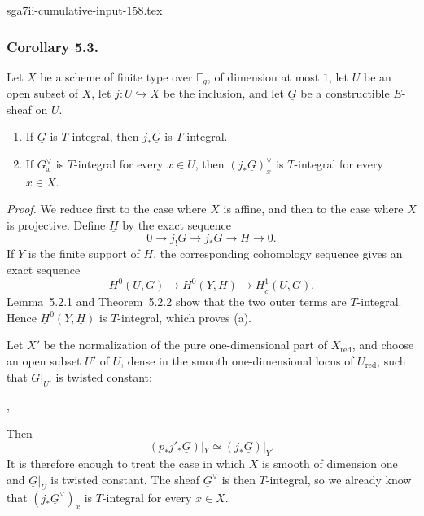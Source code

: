 \begin{filecontents*}{sga7ii-cumulative-input-158.tex}
\subsubsection*{Corollary 5.3.}
Let $X$ be a scheme of finite type over $\mathbb F_q$, of dimension at most
$1$, let $U$ be an open subset of $X$, let $j:U\hookrightarrow X$ be the
inclusion, and let $\underline G$ be a constructible $E$-sheaf on $U$.

\begin{enumerate}[label=(\alph*)]
\item If $\underline G$ is $T$-integral, then $j_*\underline G$ is
  $T$-integral.
\item If $G_x^\vee$ is $T$-integral for every $x\in U$, then
  $(j_*\underline G)_x^\vee$ is $T$-integral for every $x\in X$.
\end{enumerate}

\medskip
\noindent\emph{Proof.}
We reduce first to the case where $X$ is affine, and then to the case where
$X$ is projective.  Define $\underline H$ by the exact sequence
\[
0\longrightarrow j_!\underline G\longrightarrow j_*\underline G
\longrightarrow\underline H\longrightarrow0.
\]
If $Y$ is the finite support of $\underline H$, the corresponding
cohomology sequence gives an exact sequence
\[
\underline H^0(U,\underline G)\longrightarrow
\underline H^0(Y,\underline H)\longrightarrow
\underline H_c^1(U,\underline G).
\]
Lemma~5.2.1 and Theorem~5.2.2 show that the two outer terms are
$T$-integral.  Hence $\underline H^0(Y,\underline H)$ is $T$-integral,
which proves (a).

Let $X'$ be the normalization of the pure one-dimensional part of
$X_{\mathrm{red}}$, and choose an open subset $U'$ of $U$, dense in the
smooth one-dimensional locus of $U_{\mathrm{red}}$, such that
$\underline G|_{U'}$ is twisted constant:
\begin{center}
\qquad ,
\end{center}
Then
\[
(p_*j'_*\underline G)|_Y\simeq(j_*\underline G)|_Y.
\]
It is therefore enough to treat the case in which $X$ is smooth of
dimension one and $\underline G|_U$ is twisted constant.  The sheaf
$\underline G^\vee$ is then $T$-integral, so we already know that
$(j_*\underline G^\vee)_x$ is $T$-integral for every $x\in X$.


\end{filecontents*}
